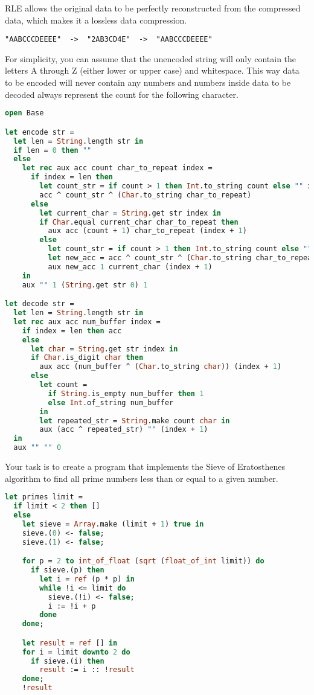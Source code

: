 RLE allows the original data to be perfectly reconstructed from the compressed data, which makes it a lossless data compression.

\begin{verbatim}
"AABCCCDEEEE"  ->  "2AB3CD4E"  ->  "AABCCCDEEEE"
\end{verbatim}

For simplicity, you can assume that the unencoded string will only contain the letters A through Z (either lower or upper case) and whitespace.
This way data to be encoded will never contain any numbers and numbers inside data to be decoded always represent the count for the following character.

\begin{lstlisting}[language=OCaml]
open Base

let encode str =
  let len = String.length str in
  if len = 0 then ""
  else
    let rec aux acc count char_to_repeat index =
      if index = len then
        let count_str = if count > 1 then Int.to_string count else "" in
        acc ^ count_str ^ (Char.to_string char_to_repeat)
      else
        let current_char = String.get str index in
        if Char.equal current_char char_to_repeat then
          aux acc (count + 1) char_to_repeat (index + 1)
        else
          let count_str = if count > 1 then Int.to_string count else "" in
          let new_acc = acc ^ count_str ^ (Char.to_string char_to_repeat) in
          aux new_acc 1 current_char (index + 1)
    in
    aux "" 1 (String.get str 0) 1

let decode str =
  let len = String.length str in
  let rec aux acc num_buffer index =
    if index = len then acc
    else
      let char = String.get str index in
      if Char.is_digit char then
        aux acc (num_buffer ^ (Char.to_string char)) (index + 1)
      else
        let count =
          if String.is_empty num_buffer then 1
          else Int.of_string num_buffer
        in
        let repeated_str = String.make count char in
        aux (acc ^ repeated_str) "" (index + 1)
  in
  aux "" "" 0
\end{lstlisting}

Your task is to create a program that implements the Sieve of Eratosthenes algorithm to find all prime numbers less than or equal to a given number.

\begin{lstlisting}[language=OCaml]
let primes limit =
  if limit < 2 then []
  else
    let sieve = Array.make (limit + 1) true in
    sieve.(0) <- false;
    sieve.(1) <- false;

    for p = 2 to int_of_float (sqrt (float_of_int limit)) do
      if sieve.(p) then
        let i = ref (p * p) in
        while !i <= limit do
          sieve.(!i) <- false;
          i := !i + p
        done
    done;

    let result = ref [] in
    for i = limit downto 2 do
      if sieve.(i) then
        result := i :: !result
    done;
    !result
\end{lstlisting}

